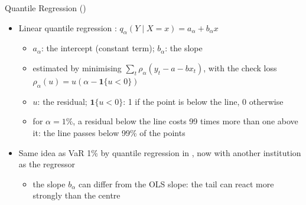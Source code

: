 \begin{frame}{Quantile Regression ()}
\itemsize{\small}
\begin{itemize}
    \item Linear quantile regression : $q_\alpha(Y \mid X = x) = a_\alpha + b_\alpha x$
    \begin{itemize}
        \item $a_\alpha$: the intercept (constant term); $b_\alpha$: the slope
        \item estimated by minimising $\sum_t \rho_\alpha(y_t - a - bx_t)$, with the check loss $\rho_\alpha(u) = u(\alpha - \mathbf{1}\{u < 0\})$
        \item $u$: the residual; $\mathbf{1}\{u < 0\}$: 1 if the point is below the line, 0 otherwise
        \item for $\alpha = 1\%$, a residual below the line costs 99 times more than one above it: the line passes below 99\% of the points
    \end{itemize}
    \item Same idea as VaR 1\% by quantile regression in , now with another institution as the regressor
    \begin{itemize}
        \item the slope $b_\alpha$ can differ from the OLS slope: the tail can react more strongly than the centre
    \end{itemize}
\end{itemize}
\end{frame}

